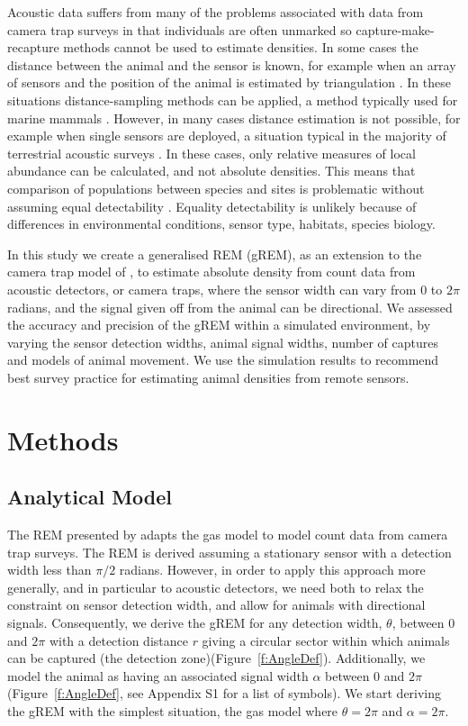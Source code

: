\documentclass[a4paper,10pt,reqno,oneside]{amsart}
\begin{document}
Acoustic data suffers from many of the problems associated with data from camera trap surveys in that individuals are often unmarked so capture-make-recapture methods cannot be used to estimate densities. In some cases the distance between the animal and the sensor is known, for example when an array of sensors and the position of the animal is estimated by triangulation \citep{lewis2007sperm}. In these situations distance-sampling methods can be applied, a method typically used for marine mammals \citep{rogers2013density}. However, in many cases distance estimation is not possible, for example when single sensors are deployed, a situation typical in the majority of terrestrial acoustic surveys  \citep{elphick2008you, buckland2008estimating}. In these cases, only relative measures of local abundance can be calculated, and not absolute densities. This means that comparison of populations between species and sites is problematic without assuming equal detectability \citep{schmidt2003count}. %
Equality detectability is unlikely because of differences in environmental conditions, sensor type, habitats, species biology. 

In this study we create a generalised REM (gREM), as an extension to the camera trap model of \citep{rowcliffe2008estimating}, to estimate absolute density from count data from acoustic detectors, or camera traps, where the sensor width can vary from 0 to $2\pi$ radians, and the signal given off from the animal can be directional. We assessed the accuracy and precision of the gREM within a simulated environment, by varying the sensor detection widths, animal signal widths, number of captures and models of animal movement. We use the simulation results to recommend best survey practice for estimating animal densities from remote sensors. 

\section*{Methods}

\subsection*{Analytical Model}

The REM presented by \citep{rowcliffe2008estimating} adapts the gas model to model count data from camera trap surveys. The REM is derived assuming a stationary sensor with a detection width less than $\pi/2$ radians. However, in order to apply this approach more generally, and in particular to acoustic detectors, we need both to relax the constraint on sensor detection width, and allow for animals with directional signals. Consequently, we derive the gREM for any detection width, $ \theta$, between 0 and $2\pi$ with a detection distance $r$ giving a circular sector within which animals can be captured (the detection zone)(Figure~\ref{f:AngleDef}). Additionally, we model the animal as having an associated signal width $\alpha$ between 0 and $2\pi$(Figure~\ref{f:AngleDef}, see Appendix S1 for a list of symbols). We start deriving the gREM with the simplest situation, the gas model where $\theta =  2\pi$ and $ \alpha =  2\pi$. 
\end{document}
